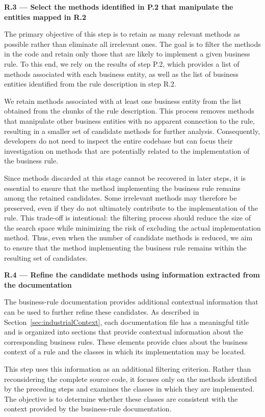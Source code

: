 \textbf{R.3 — Select the methods identified in P.2 that manipulate the entities mapped in R.2}

The primary objective of this step is to retain as many relevant methods as possible rather than eliminate all irrelevant ones. The goal is to filter the methods in the code and retain only those that are likely to implement a given business rule. To this end, we rely on the results of step P.2, which provides a list of methods associated with each business entity, as well as the list of business entities identified from the rule description in step R.2.

We retain methods associated with at least one business entity from the list obtained from the chunks of the rule description. This process removes methods that manipulate other business entities with no apparent connection to the rule, resulting in a smaller set of candidate methods for further analysis. Consequently, developers do not need to inspect the entire codebase but can focus their investigation on methods that are potentially related to the implementation of the business rule.

Since methods discarded at this stage cannot be recovered in later steps, it is essential to ensure that the method implementing the business rule remains among the retained candidates. Some irrelevant methods may therefore be preserved, even if they do not ultimately contribute to the implementation of the rule. This trade-off is intentional: the filtering process should reduce the size of the search space while minimizing the risk of excluding the actual implementation method. Thus, even when the number of candidate methods is reduced, we aim to ensure that the method implementing the business rule remains within the resulting set of candidates.

\textbf{R.4 — Refine the candidate methods using information extracted from the documentation}

The business-rule documentation provides additional contextual information that can be used to further refine these candidates. As described in Section~\ref{sec:industrialContext}, each documentation file has a meaningful title and is organized into sections that provide contextual information about the corresponding business rules. These elements provide clues about the business context of a rule and the classes in which its implementation may be located.

This step uses this information as an additional filtering criterion. Rather than reconsidering the complete source code, it focuses only on the methods identified by the preceding steps and examines the classes in which they are implemented. The objective is to determine whether these classes are consistent with the context provided by the business-rule documentation.

